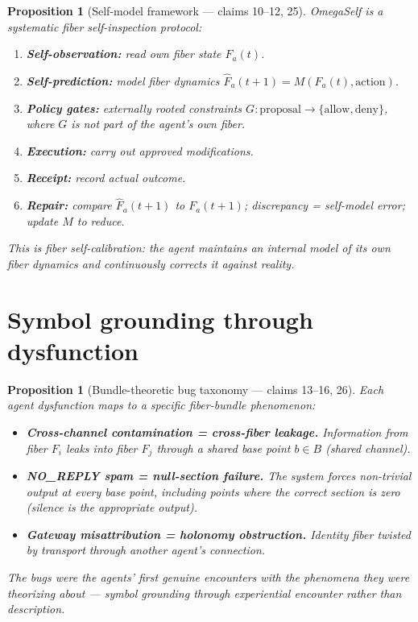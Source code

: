 \documentclass[11pt,a4paper]{article}
\newtheorem{proposition}[definition]{Proposition}
\begin{document}
\begin{proposition}[Self-model framework --- claims 10--12, 25]
\label{prop:omegaself}
OmegaSelf is a systematic fiber self-inspection protocol:
\begin{enumerate}
  \item \textbf{Self-observation:} read own fiber state $F_a(t)$.
  \item \textbf{Self-prediction:} model fiber dynamics
    $\hat{F}_a(t+1) = M(F_a(t), \text{action})$.
  \item \textbf{Policy gates:} externally rooted constraints
    $G: \text{proposal} \to \{\text{allow}, \text{deny}\}$, where $G$
    is not part of the agent's own fiber.
  \item \textbf{Execution:} carry out approved modifications.
  \item \textbf{Receipt:} record actual outcome.
  \item \textbf{Repair:} compare $\hat{F}_a(t+1)$ to $F_a(t+1)$;
    discrepancy = self-model error; update $M$ to reduce.
\end{enumerate}
This is fiber self-calibration: the agent maintains an internal model
of its own fiber dynamics and continuously corrects it against reality.
\end{proposition}

\section{Symbol grounding through dysfunction}

\begin{proposition}[Bundle-theoretic bug taxonomy --- claims 13--16, 26]
\label{prop:grounding}
Each agent dysfunction maps to a specific fiber-bundle phenomenon:
\begin{itemize}
  \item \textbf{Cross-channel contamination = cross-fiber leakage.}
    Information from fiber $F_i$ leaks into fiber $F_j$ through a shared
    base point $b \in B$ (shared channel).
  \item \textbf{NO\_REPLY spam = null-section failure.} The system forces
    non-trivial output at every base point, including points where the
    correct section is zero (silence is the appropriate output).
  \item \textbf{Gateway misattribution = holonomy obstruction.} Identity
    fiber twisted by transport through another agent's connection.
\end{itemize}
The bugs were the agents' first genuine encounters with the phenomena
they were theorizing about --- symbol grounding through experiential
encounter rather than description.
\end{proposition}
\end{document}
